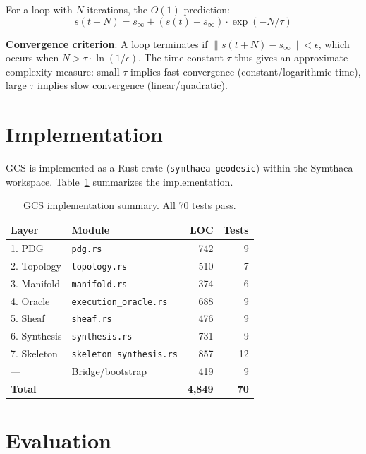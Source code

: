 \documentclass[11pt,a4paper]{article}
\begin{document}
For a loop with $N$ iterations, the $O(1)$ prediction:
\begin{equation}
    s(t+N) = s_\infty + (s(t) - s_\infty) \cdot \exp(-N/\tau)
\end{equation}

\textbf{Convergence criterion}: A loop terminates if
$\|s(t+N) - s_\infty\| < \epsilon$, which occurs when $N > \tau \cdot \ln(1/\epsilon)$.
The time constant $\tau$ thus gives an approximate complexity measure:
small $\tau$ implies fast convergence (constant/logarithmic time),
large $\tau$ implies slow convergence (linear/quadratic).

\section{Implementation}

GCS is implemented as a Rust crate (\texttt{symthaea-geodesic}) within the
Symthaea workspace. Table~\ref{tab:modules} summarizes the implementation.

\begin{table}[h]
\centering
\begin{tabular}{llrr}
\toprule
\textbf{Layer} & \textbf{Module} & \textbf{LOC} & \textbf{Tests} \\
\midrule
1. PDG & \texttt{pdg.rs} & 742 & 9 \\
2. Topology & \texttt{topology.rs} & 510 & 7 \\
3. Manifold & \texttt{manifold.rs} & 374 & 6 \\
4. Oracle & \texttt{execution\_oracle.rs} & 688 & 9 \\
5. Sheaf & \texttt{sheaf.rs} & 476 & 9 \\
6. Synthesis & \texttt{synthesis.rs} & 731 & 9 \\
7. Skeleton & \texttt{skeleton\_synthesis.rs} & 857 & 12 \\
— & Bridge/bootstrap & 419 & 9 \\
\midrule
\textbf{Total} & & \textbf{4,849} & \textbf{70} \\
\bottomrule
\end{tabular}
\caption{GCS implementation summary. All 70 tests pass.}
\label{tab:modules}
\end{table}

\section{Evaluation}
\end{document}
